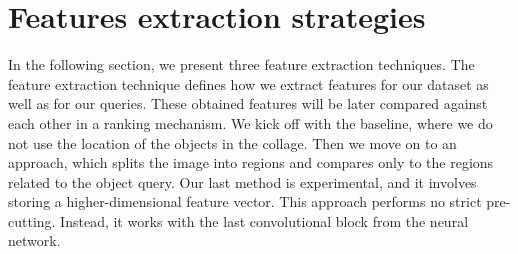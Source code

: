 \section{Features extraction strategies}

In the following section, we present three feature extraction techniques. The feature extraction technique defines how we extract features for our dataset as well as for our queries. These obtained features will be later compared against each other in a ranking mechanism. We kick off with the baseline, where we do not use the location of the objects in the collage. Then we move on to an approach, which splits the image into regions and compares only to the regions related to the object query. Our last method is experimental, and it involves storing a higher-dimensional feature vector. This approach performs no strict pre-cutting. Instead, it works with the last convolutional block from the neural network.

